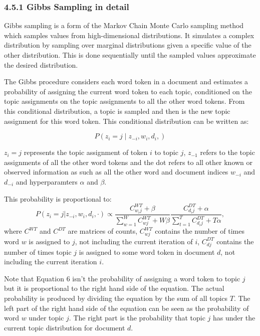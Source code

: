 \documentclass[
]{article}
\begin{document}
\hypertarget{gibbs-sampling-in-detail}{%
\subsubsection{4.5.1 Gibbs Sampling in
detail}\label{gibbs-sampling-in-detail}}

Gibbs sampling is a form of the Markov Chain Monte Carlo sampling method
which samples values from high-dimensional distributions. It simulates a
complex distribution by sampling over marginal distributions given a
specific value of the other distribution. This is done sequentially
until the sampled values approximate the desired distribution.

The Gibbs procedure considers each word token in a document and
estimates a probability of assigning the current word token to each
topic, conditioned on the topic assignments on the topic assignments to
all the other word tokens. From this conditional distribution, a topic
is sampled and then is the new topic assignment for this word token.
This conditional distribution can be written as:

\begin{equation}
P(z_i=j \mid z_{-i}, w_i, d_i,)
\end{equation}

\(z_i=j\) represents the topic assignment of token \(i\) to topic \(j\),
\(z_{-1}\) refers to the topic assignments of all the other word tokens
and the dot refers to all other known or observed information as such as
all the other word and document indices \(w_{-i}\) and \(d_{-i}\) and
hyperparamters \(\alpha\) and \(\beta\).

This probability is proportional to: \begin{equation}
P(z_i = j | z_{-i}, w_i, d_i, \cdot) \propto \frac{C^{WT}_{w_ij} + \beta}{\sum_{w=1}^{W}C^{WT}_{wj} + W\beta}\frac{C^{DT}_{d_ij} + \alpha}{\sum_{t=1}^{T}C^{DT}_{d_ij} + T\alpha},
\end{equation} where \(C^{WT}\) and \(C^{DT}\) are matrices of counts,
\(C^{WT}_{wj}\) contains the number of times word \(w\) is assigned to
\(j\), not including the current iteration of \(i\), \(C^{DT}_{dj}\)
contains the number of times topic \(j\) is assigned to some word token
in document \(d\), not including the current iteration \(i\).

Note that Equation 6 isn't the probability of assigning a word token to
topic \(j\) but it is proportional to the right hand side of the
equation. The actual probability is produced by dividing the equation by
the sum of all topics \(T\). The left part of the right hand side of the
equation can be seen as the probability of word \(w\) under topic \(j\).
The right part is the probability that topic \(j\) has under the current
topic distribution for document \(d\).
\end{document}
